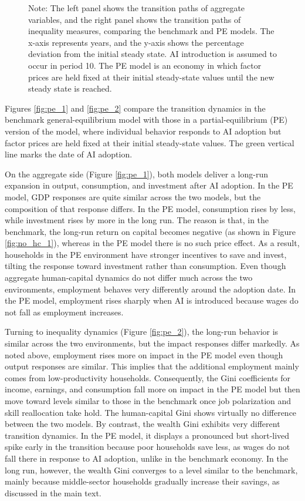 \documentclass[12pt,english]{article}
\numberwithin{equation}{section}
\begin{document}
{\begin{figure}[!t]
    \begin{flushleft}
    \scriptsize
    Note: The left panel shows the transition paths of aggregate variables, and the right panel shows the transition paths of inequality measures, comparing the benchmark and PE models. The x-axis represents years, and the y-axis shows the percentage deviation from the initial steady state. AI introduction is assumed to occur in period 10. The PE model is an economy in which factor prices are held fixed at their initial steady-state values until the new steady state is reached.
    \end{flushleft}
\end{figure}

Figures  \ref{fig:pe_1} and   \ref{fig:pe_2} compare the transition dynamics in the benchmark general-equilibrium model with those in a partial-equilibrium (PE) version of the model, where individual behavior responds to AI adoption but factor prices are held fixed at their initial steady-state values. The green vertical line marks the date of AI adoption.

On the aggregate side (Figure \ref{fig:pe_1}), both models deliver a long-run expansion in output, consumption, and investment after AI adoption.  In the PE model, GDP responses are quite similar across the two models, but the composition of that response differs.  In the PE model, consumption rises by less, while investment rises by more in the long run. The reason is that, in the benchmark, the long-run return on capital becomes negative (as shown in Figure \ref{fig:no_hc_1}), whereas in the PE model there is no such price effect. As a result, households in the PE environment have stronger incentives to save and invest, tilting the response toward investment rather than consumption. Even though aggregate human-capital dynamics do not differ much across the two environments, employment behaves very differently around the adoption date. In the PE model, employment rises sharply when AI is introduced because wages do not fall as employment increases.

 

Turning to inequality dynamics (Figure \ref{fig:pe_2}), the long-run behavior is similar across the two environments, but the impact responses differ markedly. As noted above, employment rises more on impact in the PE model even though output responses are similar. This implies that the additional employment mainly comes from low-productivity households. Consequently, the Gini coefficients for income, earnings, and consumption fall more on impact in the PE model but then move toward levels similar to those in the benchmark once job polarization and skill reallocation take hold. The human-capital Gini shows virtually no difference between the two models.  By contrast, the wealth Gini exhibits very different transition dynamics.  In the PE model, it displays a pronounced but short-lived spike early in the transition because poor households save less, as wages do not fall there in response to AI adoption, unlike in the benchmark economy.  In the long run, however, the wealth Gini converges to a level similar to the benchmark, mainly because middle-sector households gradually increase their savings, as discussed in the main text.

}
\end{document}
